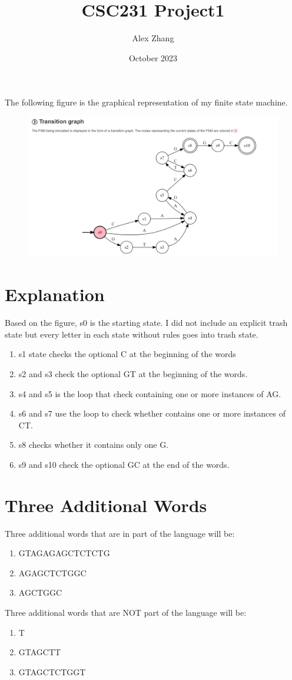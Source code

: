 \documentclass{article}
\title{CSC231 Project1}
\author{Alex Zhang}
\date{October 2023}
\begin{document}
\maketitle
The following figure is the graphical representation of my finite state machine.
\begin{figure}[!ht]
    \begin{center}
        \includegraphics[scale = 0.5]{DFSM.png}
    \end{center}
\end{figure}
\section*{Explanation}
Based on the figure, s0 is the starting state. I did not include an explicit trash state but every letter in each state without rules goes into trash state.
\begin{enumerate}
    \item s1 state checks the optional C at the beginning of the words
    \item s2 and s3 check the optional GT at the beginning of the words.
    \item s4 and s5 is the loop that check containing one or more instances of AG.
    \item s6 and s7 use the loop to check whether contains one or more instances of CT.
    \item s8 checks whether it contains only one G.
    \item s9 and s10 check the optional GC at the end of the words.
\end{enumerate}
\section*{Three Additional Words}
Three additional words that are in part of the language will be:
\begin{enumerate}
    \item GTAGAGAGCTCTCTG
    \item AGAGCTCTGGC
    \item AGCTGGC
\end{enumerate}

Three additional words that are NOT part of the language will be:
\begin{enumerate}
    \item T
    \item GTAGCTT
    \item GTAGCTCTGGT
\end{enumerate}
\end{document}
